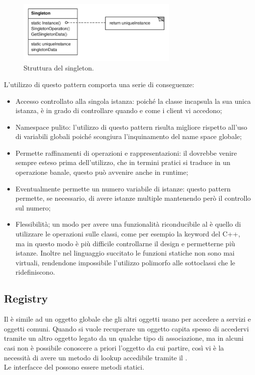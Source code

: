 		\begin{figure}[h]
	\centering \includegraphics[width=0.7\textwidth]{patterns/Singleton.png}
	\caption{Struttura del singleton.}
	\label{fig:singleton}
	\end{figure}
	
	L'utilizzo di questo pattern comporta una serie di conseguenze:
	\begin{itemize}
		\item Accesso controllato alla singola istanza: poiché la classe  incapsula la sua unica istanza, è in grado di controllare quando e come i client vi accedono;
		\item Namespace pulito: l'utilizzo di questo pattern risulta migliore rispetto all'uso di variabili globali poiché scongiura l'inquinamento del name space globale;
		\item Permette raffinamenti di operazioni e rappresentazioni: il  dovrebbe venire sempre esteso prima dell'utilizzo, che in termini pratici si traduce in un operazione banale, questo può avvenire anche in runtime;
		\item Eventualmente permette un numero variabile di istanze: questo pattern permette, se necessario, di avere istanze multiple mantenendo però il controllo sul numero;
		\item Flessibilità; un modo per avere una funzionalità riconducibile al  è quello di utilizzare le operazioni sulle classi, come per esempio la keyword  del C++, ma in questo modo è più difficile controllarne il design e permetterne più istanze. Inoltre nel linguaggio succitato le funzioni statiche non sono mai virtuali, rendendone impossibile l'utilizzo polimorfo alle sottoclassi che le ridefiniscono.
	\end{itemize}
	
	
	
	
	
	
	
	\subsection{Registry} %
	Il  è simile ad un oggetto globale che gli altri oggetti usano per accedere a servizi e oggetti comuni. Quando si vuole recuperare un oggetto capita spesso di accedervi tramite un altro oggetto legato da un qualche tipo di associazione, ma in alcuni casi non è possibile conoscere a priori l'oggetto da cui partire, così vi è la necessità di avere un metodo di lookup accedibile tramite il .  \\
	Le interfacce del  possono essere metodi statici.